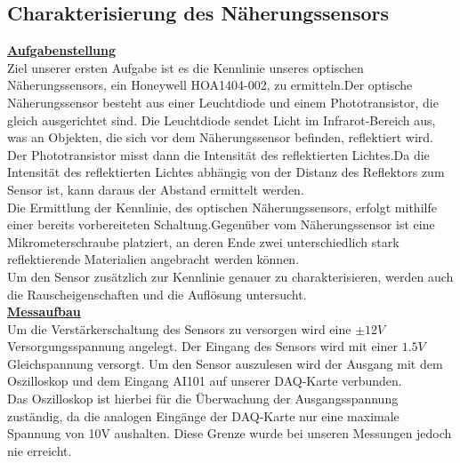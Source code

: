 \documentclass[a4paper,12pt]{article}
\begin{document}
	\subsection{Charakterisierung des Näherungssensors}
	\underline{\textbf{Aufgabenstellung}} \\ \newline
	\noindent
	Ziel unserer ersten Aufgabe ist es die Kennlinie unseres optischen Näherungssensors, ein Honeywell HOA1404-002, zu ermitteln.\newline Der optische Näherungssensor besteht aus einer Leuchtdiode und einem Phototransistor, die gleich ausgerichtet sind. Die Leuchtdiode sendet Licht im Infrarot-Bereich aus, was an Objekten, die sich vor dem Näherungssensor befinden, reflektiert wird. Der Phototransistor misst dann die Intensität des reflektierten Lichtes.\newline Da die Intensität des reflektierten Lichtes abhängig von der Distanz des Reflektors zum Sensor ist, kann daraus der Abstand ermittelt werden. \\ \newline
	Die Ermittlung der Kennlinie, des optischen Näherungssensors, erfolgt mithilfe einer bereits vorbereiteten Schaltung.\newline Gegenüber vom Näherungssensor ist eine Mikrometerschraube platziert, an deren Ende zwei unterschiedlich stark reflektierende Materialien angebracht werden können.\\ \newline
	Um den Sensor zusätzlich zur Kennlinie genauer zu charakterisieren, werden auch die Rauscheigenschaften und die Auflösung untersucht.\\ \newline
	\noindent
	\underline{\textbf{Messaufbau}} \\ \newline
	Um die Verstärkerschaltung des Sensors zu versorgen wird eine $\pm12V$ Versorgungsspannung angelegt. Der Eingang des Sensors wird mit einer $1.5V$ Gleichspannung versorgt. Um den Sensor auszulesen wird der Ausgang mit dem Oszilloskop und dem Eingang AI101 auf unserer DAQ-Karte verbunden.\\ \newline
	Das Oszilloskop ist hierbei für die Überwachung der Ausgangsspannung zuständig, da die analogen Eingänge der DAQ-Karte nur eine maximale Spannung von 10V aushalten.\newline
	Diese Grenze wurde bei unseren Messungen jedoch nie erreicht.\newline
\end{document}

